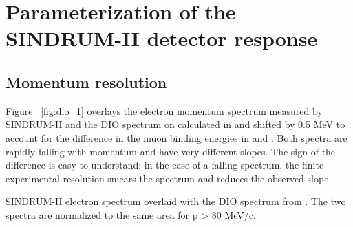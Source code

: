 \newpage
\section {Parameterization of the SINDRUM-II detector response}
\label{sec:detector_response}

\subsection{Momentum resolution}

Figure ~\ref{fig:dio_1} overlays the electron momentum spectrum measured by SINDRUM-II
and the DIO spectrum on  calculated in \cite{Watanabe_1993} and shifted by 0.5 MeV
to account for the difference in the muon binding energies in  and . 
Both spectra are rapidly falling with momentum and have very different slopes.
The sign of the difference is easy to understand: in the case of a falling spectrum,
the finite experimental resolution smears the spectrum and reduces the observed slope. 

\vspace{0.2in}
 {
  \label{fig:dio_1}
  SINDRUM-II electron spectrum overlaid with the DIO spectrum from \cite{Watanabe_1993}.
  The two spectra are normalized to the same area for p > 80 MeV/c.
}
\vspace{0.2in}

